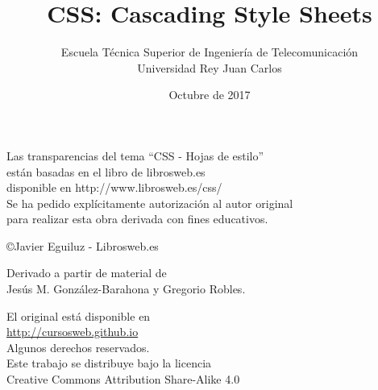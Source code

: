 \documentclass[ucs]{beamer}
\begin{document}
\title[CSS]{CSS: Cascading Style Sheets}
\author[GSyC]{Escuela Técnica Superior de Ingeniería de Telecomunicación\\
Universidad Rey Juan Carlos}
\date[2017]{Octubre de 2017}


\begin{frame}
  \titlepage
\end{frame}



\begin{frame}[b]



\vspace{1cm}
\begin{footnotesize}

\begin{flushright}
Las transparencias del tema ``CSS - Hojas de estilo'' \\
están basadas en el libro de librosweb.es \\
disponible en http://www.librosweb.es/css/ \\
Se ha pedido explícitamente autorización al autor original \\
para realizar esta obra derivada con fines educativos.

\copyright Javier Eguiluz - Librosweb.es \\
\vspace{1cm}
\end{flushright}



\begin{flushright}
{


Derivado a partir de material de \\
Jesús M. González-Barahona y Gregorio Robles.

El original está disponible en \\
\url{http://cursosweb.github.io}\\
  Algunos derechos reservados. \\
  Este trabajo se distribuye bajo la licencia \\
  Creative Commons Attribution Share-Alike 4.0\\
}


\end{flushright}  


\end{footnotesize}
\end{frame}
\end{document}
